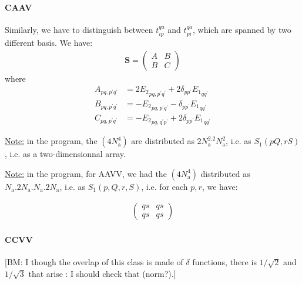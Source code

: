 \documentclass{article}
\newcommand  \todo[1]      {{\color{blue}[BM: #1]}}
\newcommand  \equ[2]       {\begin{align}#2\label{#1}\end{align}}
\renewcommand\b[1]         {\mathbf{#1}}
\renewcommand\P            {^\prime}
\begin{document}
\paragraph{CAAV}

Similarly, we have to distinguish between $t_{ip}^{qa}$ and $t_{pi}^{qa}$, which are spanned by two different basis. We have:
\equ{ }{
  \b{S}=\begin{pmatrix}
    A & B \\ B & C
  \end{pmatrix}
}
where
\equ{ }{
  A_{pq,p\P q\P}&=2{E_2}_{pq,p\P q\P} +2\delta_{p p\P} {E_1}_{q q\P}\\
  B_{pq,p\P q\P}&=-{E_2}_{pq,p\P q\P} - \delta_{p p\P} {E_1}_{q q\P}\\
  C_{pq,p\P q\P}&=-{E_2}_{pq,q\P p\P} +2\delta_{p p\P} {E_1}_{q q\P}
}

\noindent
\underline{Note:} in the program, the $(4 N_\text{a}^4)$ are distributed as $2N_\text{a}^2.2N_\text{a}^2$, i.e. as $S_1(pQ,rS)$, i.e. as a two-dimensionnal array.

\noindent
\underline{Note:} in the program, for AAVV, we had the $(4 N_\text{a}^4)$ distributed as $N_\text{a}.2N_\text{a}.N_\text{a}.2N_\text{a}$, i.e. as $S_1(p,Q,r,S)$, i.e. for each $p,r$, we have:

\equ{ }{
  \begin{pmatrix}
    qs & qs \\ qs & qs
  \end{pmatrix}
}

\paragraph{CCVV}

\todo{I though the overlap of this class is made of $\delta$ functions, there is $1/\sqrt{2}$ and $1/\sqrt{3}$ that arise : I should check that (norm?).}
\end{document}
